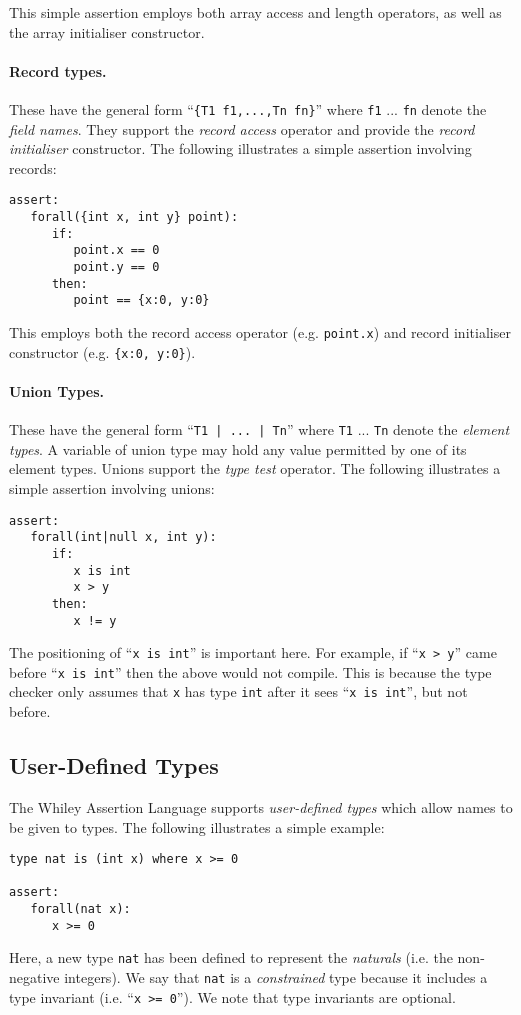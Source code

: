This simple assertion employs both array access and length operators,
as well as the array initialiser constructor.

\paragraph{Record types.} These have the general form ``\lstinline|{T1 f1,...,Tn fn}|'' where \lstinline{f1} ... \lstinline{fn} denote the
{\em field names}.  They support the {\em record access} operator and
provide the {\em record initialiser} constructor.  The following
illustrates a simple assertion involving records:

\begin{lstlisting}[language=WyAL]
assert:
   forall({int x, int y} point):
      if:
         point.x == 0
         point.y == 0
      then:
         point == {x:0, y:0}
\end{lstlisting}

This employs both the record access operator
(e.g. \lstinline{point.x}) and record initialiser constructor
(e.g. \lstinline|{x:0, y:0}|).

\paragraph{Union Types.}  These have the general form ``\lstinline{T1 | ... | Tn}'' where \lstinline{T1} ... \lstinline{Tn} denote the
{\em element types}.  A variable of union type may hold any value
permitted by one of its element types.  Unions support the {\em type
  test} operator.  The following illustrates a simple assertion
involving unions:
\begin{lstlisting}[language=WyAL]
assert:
   forall(int|null x, int y):
      if:
         x is int
         x > y
      then:
         x != y
\end{lstlisting}
The positioning of ``\lstinline{x is int}'' is important here.  For
example, if ``\lstinline{x > y}'' came before ``\lstinline{x is int}''
then the above would not compile.  This is because the type checker
only assumes that \lstinline{x} has type \lstinline{int} after it sees
``\lstinline{x is int}'', but not before.

\subsection{User-Defined Types}
 
The Whiley Assertion Language supports {\em user-defined types} which
allow names to be given to types.  The following illustrates a simple
example:
\begin{lstlisting}[language=WyAL]
type nat is (int x) where x >= 0

assert:
   forall(nat x):
      x >= 0
\end{lstlisting}
Here, a new type \lstinline{nat} has been defined to represent the
{\em naturals} (i.e. the non-negative integers).  We say that
\lstinline{nat} is a {\em constrained} type because it includes a type
invariant (i.e. ``\lstinline{x >= 0}'').  We note that type invariants
are optional.

